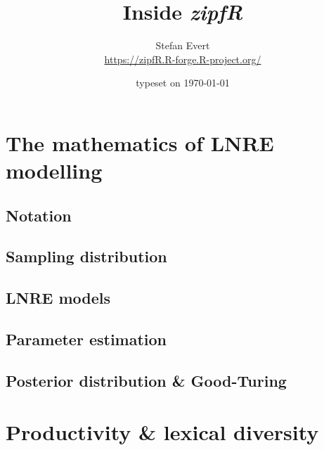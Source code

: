 \documentclass[a4paper]{article}
\title{Inside \emph{zipfR}}
\author{Stefan Evert\\ \url{https://zipfR.R-forge.R-project.org/}}
\date{typeset on \today}
\begin{document}
\maketitle

\tableofcontents


\section{The mathematics of LNRE modelling}
\label{sec:lnre}

\subsection{Notation}
\label{sec:lnre:notation}

\subsection{Sampling distribution}
\label{sec:lnre:expectation}

\subsection{LNRE models}
\label{sec:lnre:model}

\subsection{Parameter estimation}
\label{sec:lnre:estimation}

\subsection{Posterior distribution \& Good-Turing}
\label{sec:lnre:posterior}


\section{Productivity \& lexical diversity}
\label{sec:prod}
\end{document}
